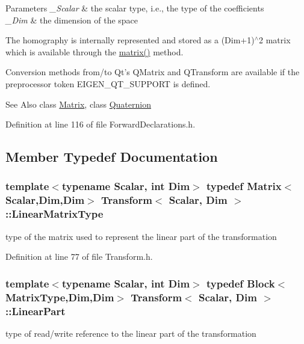 \begin{DoxyParams}{Parameters}
{\em \-\_\-\-Scalar} & the scalar type, i.\-e., the type of the coefficients \\
\hline
{\em \-\_\-\-Dim} & the dimension of the space\\
\hline
\end{DoxyParams}
The homography is internally represented and stored as a (Dim+1)$^\wedge$2 matrix which is available through the \hyperlink{class_transform_ae71e6730a40ab692848b5fd94dd185e9}{matrix()} method.

Conversion methods from/to Qt's Q\-Matrix and Q\-Transform are available if the preprocessor token E\-I\-G\-E\-N\-\_\-\-Q\-T\-\_\-\-S\-U\-P\-P\-O\-R\-T is defined.

\begin{DoxySeeAlso}{See Also}
class \hyperlink{class_matrix}{Matrix}, class \hyperlink{class_quaternion}{Quaternion} 
\end{DoxySeeAlso}


Definition at line 116 of file Forward\-Declarations.\-h.



\subsection{Member Typedef Documentation}
\hypertarget{class_transform_ac41e348fcbe528edca0c5e8b1954ba87}{
\subsubsection[{Linear\-Matrix\-Type}]{\setlength{\rightskip}{0pt plus 5cm}template$<$typename Scalar, int Dim$>$ typedef {\bf Matrix}$<${\bf Scalar},Dim,Dim$>$ {\bf Transform}$<$ {\bf Scalar}, Dim $>$\-::{\bf Linear\-Matrix\-Type}}}\label{class_transform_ac41e348fcbe528edca0c5e8b1954ba87}
type of the matrix used to represent the linear part of the transformation 

Definition at line 77 of file Transform.\-h.

\hypertarget{class_transform_adb8a1fb72e2dcea3ffc41f85e81552b6}{
\subsubsection[{Linear\-Part}]{\setlength{\rightskip}{0pt plus 5cm}template$<$typename Scalar, int Dim$>$ typedef {\bf Block}$<${\bf Matrix\-Type},Dim,Dim$>$ {\bf Transform}$<$ {\bf Scalar}, Dim $>$\-::{\bf Linear\-Part}}}\label{class_transform_adb8a1fb72e2dcea3ffc41f85e81552b6}
type of read/write reference to the linear part of the transformation 

